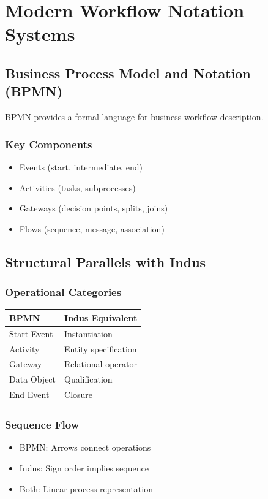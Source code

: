 \section{Modern Workflow Notation Systems}

\subsection{Business Process Model and Notation (BPMN)}

BPMN provides a formal language for business workflow description.

\subsubsection{Key Components}
\begin{itemize}
    \item Events (start, intermediate, end)
    \item Activities (tasks, subprocesses)
    \item Gateways (decision points, splits, joins)
    \item Flows (sequence, message, association)
\end{itemize}

\subsection{Structural Parallels with Indus}

\subsubsection{Operational Categories}
\begin{center}
\begin{tabular}{ll}
BPMN & Indus Equivalent \\
\hline
Start Event & Instantiation \\
Activity & Entity specification \\
Gateway & Relational operator \\
Data Object & Qualification \\
End Event & Closure \\
\end{tabular}
\end{center}

\subsubsection{Sequence Flow}
\begin{itemize}
    \item BPMN: Arrows connect operations
    \item Indus: Sign order implies sequence
    \item Both: Linear process representation
\end{itemize}


